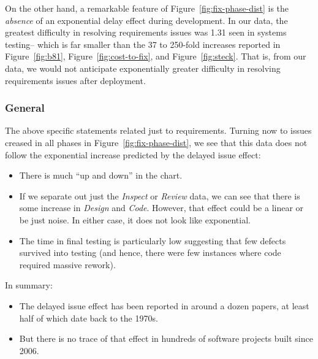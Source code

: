 \documentclass{sig-alternate}
\newcommand{\bi}{\begin{itemize}}%
\newcommand{\ei}{\end{itemize}}
\newcommand{\fig}[1]{Figure~\ref{fig:#1}}
\begin{document}
On the other hand, a remarkable feature of Figure~\ref{fig:fix-phase-dist} is the {\em absence}
of an exponential delay effect during development.
In our data, the greatest difficulty in resolving requirements issues was 1.31 seen in systems testing--
which is far smaller than the 37 to 250-fold increases reported in \fig{b81}, \fig{cost-to-fix},
and \fig{steck}.  That is, from our  data, we would not anticipate exponentially greater difficulty in resolving requirements issues after
deployment. 
 \subsubsection{General}
 The above specific statements related just to requirements. Turning now
 to issues creased in all phases in Figure~\ref{fig:fix-phase-dist},  we see that
 this data does not follow the exponential increase predicted
by the delayed issue effect:
\bi
\item There is much ``up and down'' in the chart. 
\item If we separate out just the {\em Inspect} or {\em Review} data, we can see that there is some increase in {\em Design} and {\em Code}. However, that effect could be a linear or be just noise. In either case,
it does not look like exponential.
\item The time in final testing is particularly low suggesting that few defects survived into testing
(and hence, there were few instances where code required massive rework).
\ei
In summary:
\bi
\item
The delayed issue effect has been reported in around a dozen papers, at least half of which date back to the 1970s. 
\item
But there is no trace of that  effect   in hundreds of software projects built  since 2006.
\ei
 


 
\end{document}
